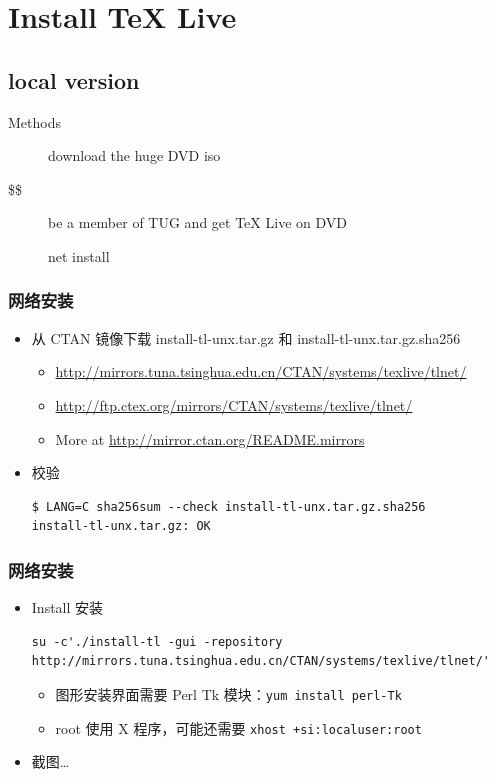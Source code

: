 \documentclass{beamer}
\def\TeXLive{\TeX{} Live\xspace}
\let\TL=\TeXLive
\begin{document}
\section{Install \TL}
\subsection{local version}
\begin{frame}{Methods}
  \begin{description}
    \item[\frownie] download the huge DVD iso
      \pause
    \item[\$\$] be a member of TUG and get \TL on DVD
      \pause
    \item[\smiley] net install
  \end{description}
\end{frame}

\begin{frame}[fragile]
  \frametitle{网络安装}
  \begin{itemize}
    \item 
从 CTAN 镜像下载
install-tl-unx.tar.gz
和
install-tl-unx.tar.gz.sha256
\begin{itemize} %
  \item \url{http://mirrors.tuna.tsinghua.edu.cn/CTAN/systems/texlive/tlnet/}
  \item \url{http://ftp.ctex.org/mirrors/CTAN/systems/texlive/tlnet/}
  \item More at \url{http://mirror.ctan.org/README.mirrors}
\end{itemize}

\item 校验
\begin{lstlisting}
$ LANG=C sha256sum --check install-tl-unx.tar.gz.sha256 
install-tl-unx.tar.gz: OK
\end{lstlisting}

  \end{itemize}
\end{frame}

\begin{frame}[fragile]
  \frametitle{网络安装}
  \begin{itemize}
    \item Install 安装
      \begin{lstlisting}
su -c'./install-tl -gui -repository http://mirrors.tuna.tsinghua.edu.cn/CTAN/systems/texlive/tlnet/'
      \end{lstlisting}

      \begin{itemize}
        \item 图形安装界面需要 Perl Tk 模块：\texttt{yum install
          perl-Tk}
        \item root 使用 X 程序，可能还需要 \texttt{xhost
          +si:localuser:root}
      \end{itemize}
\item 截图\dots
\end{itemize}
\end{frame}
\end{document}
